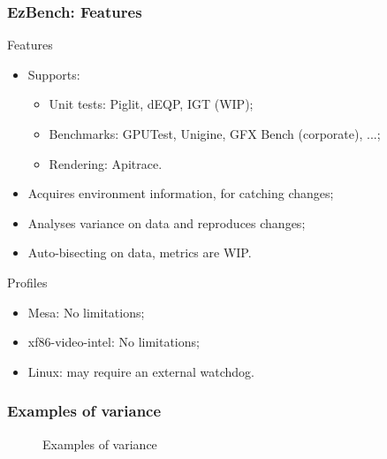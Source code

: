 \documentclass[11pt,english,compress]{beamer}
\begin{document}
\begin{frame}
	\frametitle{EzBench: Features}

	\begin{block}{Features}
		\begin{itemize}
			\item Supports:
			\begin{itemize}
				\item Unit tests: Piglit, dEQP, IGT (WIP);
				\item Benchmarks: GPUTest, Unigine, GFX Bench (corporate), ...;
				\item Rendering: Apitrace.
			\end{itemize}
			\item Acquires environment information, for catching changes;
			\item Analyses variance on data and reproduces changes;
			\item Auto-bisecting on data, metrics are WIP.
		\end{itemize}
	\end{block}
	
	\pause
	
	\begin{block}{Profiles}
		\begin{itemize}
			\item Mesa: No limitations;
			\item xf86-video-intel: No limitations;
			\item Linux: may require an external watchdog.
		\end{itemize}
	\end{block}
\end{frame}

\begin{frame}
	\frametitle{Examples of variance}
	
	\begin{figure}%
		\centering
		\qquad
		\pause
		\caption{Examples of variance}%
	\end{figure}
\end{frame}
\end{document}
